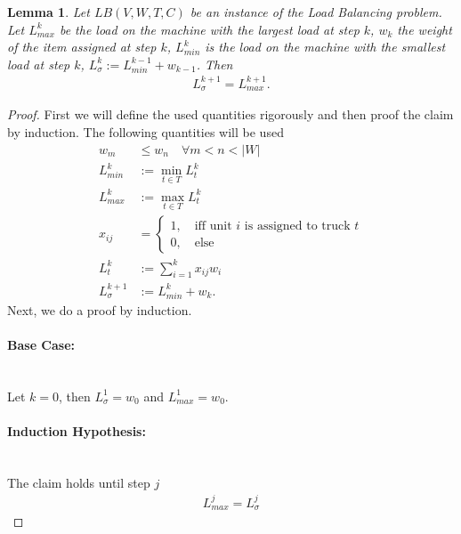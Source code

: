 \documentclass[12pt]{article}
\newtheorem{lemma}[theorem]{Lemma}
\begin{document}
\begin{lemma} \label{LB-GRDY}
Let $LB(V, W, T, C)$ be an instance of the Load Balancing problem. 
Let $L_{max}^{k}$ be the load on the machine with the largest load at step $k$, $w_k$ the weight of the item assigned at step $k$, $L^k_{min}$ is the load on the machine with the smallest load at step $k$, $L^k_{\sigma} := L^{k-1}_{min} + w_{k-1}$.
Then
\begin{gather}
L^{k+1}_{\sigma} = L_{max}^{k+1}.
\end{gather}
\end{lemma}
\begin{proof}
First we will define the used quantities rigorously and then proof the claim by induction.
The following quantities will be used
\begin{align*}
w_m &\leq w_n \quad \forall m < n < |W| \\
L_{min}^k &:= \min_{t \in T} L_t^{k} \\
L_{max}^k &:= \max_{t \in T} L_t^{k}  \\
x_{ij} &= \begin{cases}
1, \quad \text{iff unit } i \text{ is assigned to truck } t \\
0, \quad \text{else} 
\end{cases}\\
L_t^k &:= \sum_{i = 1}^{k} x_{ij} w_i \\
L_{\sigma}^{k+1} & := L_{min}^k + w_k.
\end{align*}
Next, we do a proof by induction.
\paragraph{Base Case: } \mbox{} \\
Let $k = 0$, then $L_{\sigma}^1 = w_0$ and $L_{max}^{1} = w_0$.
\paragraph{Induction Hypothesis: } \mbox{} \\
The claim holds until step $j$ 
\begin{gather*}
L_{max}^{j} = L_{\sigma}^{j}
\end{gather*}

\end{proof}
\end{document}
